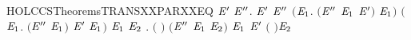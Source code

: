 \newcommand{\HOLCCSTheoremsTRANSXXPAR}{\UseVerbatim{HOLCCSTheoremsTRANSXXPAR}}
\begin{SaveVerbatim}{HOLCCSTheoremsTRANSXXPARXXEQ}
\HOLTokenTurnstile{} \HOLSymConst{\HOLTokenForall{}} \ensuremath{\HOLBoundVar{E}\sp{\prime{}}}  \ensuremath{\HOLBoundVar{E}\sp{\prime{}\prime{}}}.
      \HOLSymConst{\ensuremath{\mid}} \ensuremath{\HOLBoundVar{E}\sp{\prime{}}} \HOLTokenTransBegin{}\HOLTokenTransEnd \ensuremath{\HOLBoundVar{E}\sp{\prime{}\prime{}}} \HOLSymConst{\HOLTokenEquiv{}}
     \ensuremath{(}\HOLSymConst{\HOLTokenExists{}}\ensuremath{\HOLBoundVar{E}\sb{\mathrm{1}}}. \ensuremath{(}\ensuremath{\HOLBoundVar{E}\sp{\prime{}\prime{}}} \HOLSymConst{\ensuremath{=}} \ensuremath{\HOLBoundVar{E}\sb{\mathrm{1}}} \HOLSymConst{\ensuremath{\mid}} \ensuremath{\HOLBoundVar{E}\sp{\prime{}}}\ensuremath{)} \HOLSymConst{\HOLTokenConj{}}  \HOLTokenTransBegin{}\HOLTokenTransEnd \ensuremath{\HOLBoundVar{E}\sb{\mathrm{1}}}\ensuremath{)} \HOLSymConst{\HOLTokenDisj{}}
     \ensuremath{(}\HOLSymConst{\HOLTokenExists{}}\ensuremath{\HOLBoundVar{E}\sb{\mathrm{1}}}. \ensuremath{(}\ensuremath{\HOLBoundVar{E}\sp{\prime{}\prime{}}} \HOLSymConst{\ensuremath{=}}  \HOLSymConst{\ensuremath{\mid}} \ensuremath{\HOLBoundVar{E}\sb{\mathrm{1}}}\ensuremath{)} \HOLSymConst{\HOLTokenConj{}} \ensuremath{\HOLBoundVar{E}\sp{\prime{}}} \HOLTokenTransBegin{}\HOLTokenTransEnd \ensuremath{\HOLBoundVar{E}\sb{\mathrm{1}}}\ensuremath{)} \HOLSymConst{\HOLTokenDisj{}}
     \HOLSymConst{\HOLTokenExists{}}\ensuremath{\HOLBoundVar{E}\sb{\mathrm{1}}} \ensuremath{\HOLBoundVar{E}\sb{\mathrm{2}}} .
       \ensuremath{(} \HOLSymConst{\ensuremath{=}} \HOLConst{\ensuremath{\tau}}\ensuremath{)} \HOLSymConst{\HOLTokenConj{}} \ensuremath{(}\ensuremath{\HOLBoundVar{E}\sp{\prime{}\prime{}}} \HOLSymConst{\ensuremath{=}} \ensuremath{\HOLBoundVar{E}\sb{\mathrm{1}}} \HOLSymConst{\ensuremath{\mid}} \ensuremath{\HOLBoundVar{E}\sb{\mathrm{2}}}\ensuremath{)} \HOLSymConst{\HOLTokenConj{}}  \HOLTokenTransBegin{} \HOLTokenTransEnd \ensuremath{\HOLBoundVar{E}\sb{\mathrm{1}}} \HOLSymConst{\HOLTokenConj{}}
       \ensuremath{\HOLBoundVar{E}\sp{\prime{}}} \HOLTokenTransBegin{} \ensuremath{(} \ensuremath{)}\HOLTokenTransEnd \ensuremath{\HOLBoundVar{E}\sb{\mathrm{2}}}
\end{SaveVerbatim}
\newcommand{\HOLCCSTheoremsTRANSXXPARXXEQ}{\UseVerbatim{HOLCCSTheoremsTRANSXXPARXXEQ}}
